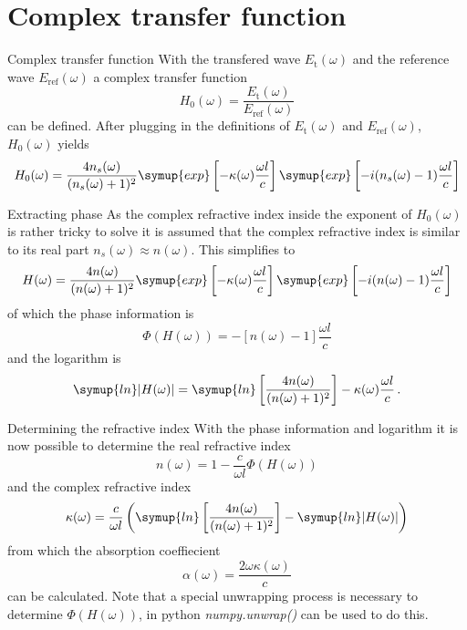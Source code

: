 \documentclass[aspectratio=1610, 9pt]{beamer}
\begin{document}
\section{Complex transfer function}
\begin{frame}{Complex transfer function}
  With the transfered wave $E_\text{t}(\omega)$ and the reference wave $E_\text{ref}(\omega)$ a complex transfer function 
  \begin{equation}
    H_0(\omega) = \frac{E_\text{t}(\omega)}{E_\text{ref}(\omega)}
  \end{equation}
  can be defined.
  After plugging in the definitions of $E_\text{t}(\omega)$ and $E_\text{ref}(\omega)$, $H_0(\omega)$ yields
  \begin{equation}
    H_0 (\omega) = \frac{4 n_s(\omega)}{(n_s(\omega) +1)^2} \symup{exp}\left[-\kappa(\omega) \frac{\omega l }{c}\right] \symup{exp}\left[-i (n_s (\omega) - 1) \frac{\omega l}{c}\right]
  \end{equation}
  \end{frame}

\begin{frame}{Extracting phase}
  As the complex refractive index inside the exponent of $H_0(\omega)$ is rather tricky to solve it is assumed that the complex refractive index is similar to its real part $n_s(\omega) \approx n(\omega)$.
  This simplifies to 
  \begin{equation}
    H(\omega) = \frac{4n(\omega)}{(n(\omega) + 1)^2} \symup{exp}\left[-\kappa(\omega) \frac{\omega l }{c}\right] \symup{exp}\left[- i(n(\omega) - 1) \frac{\omega l}{c}\right]
  \end{equation}
  of which the phase information is
  \begin{equation}
    \Phi(H(\omega)) = -[n(\omega) - 1] \frac{\omega l}{c}
  \end{equation}
  and the logarithm is
  \begin{equation}
    \symup{ln}|H(\omega)| = \symup{ln}\left[ \frac{4n(\omega)}{(n(\omega) +1)^2}\right] - \kappa(\omega) \frac{\omega l}{c} \, .
  \end{equation}
\end{frame}

\begin{frame}{Determining the refractive index}
  With the phase information and logarithm it is now possible to determine the real refractive index 
  \begin{equation}
    n(\omega) = 1 - \frac{c}{\omega l} \Phi(H(\omega))
  \end{equation}
  and the complex refractive index 
  \begin{equation}
    \kappa(\omega) = \frac{c}{\omega l } \left( \symup{ln}\left[ \frac{4 n(\omega)}{(n(\omega) + 1)^2}\right] - \symup{ln}|H(\omega)|\right)
  \end{equation}
  from which the absorption coeffiecient
  \begin{equation}
    \alpha(\omega) = \frac{2 \omega \kappa(\omega)}{c}
  \end{equation}
  can be calculated.
  Note that a special unwrapping process is necessary to determine $\Phi(H(\omega))$, in python \textit{numpy.unwrap()} can be used to do this.
\end{frame}
\end{document}
